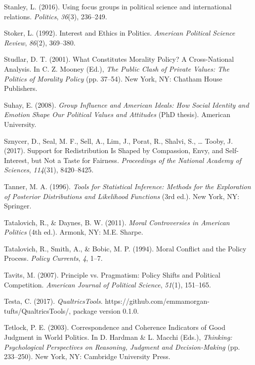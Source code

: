 \documentclass[12pt,econ]{sources/authesis}
\begin{document}
\leavevmode\hypertarget{ref-stanley_2016_using}{}%
Stanley, L. (2016). Using focus groups in political science and international relations. \emph{Politics}, \emph{36}(3), 236--249.

\leavevmode\hypertarget{ref-stoker_1992_interest}{}%
Stoker, L. (1992). Interest and Ethics in Politics. \emph{American Political Science Review}, \emph{86}(2), 369--380.

\leavevmode\hypertarget{ref-studlar_2001_what}{}%
Studlar, D. T. (2001). What Constitutes Morality Policy? A Cross-National Analysis. In C. Z. Mooney (Ed.), \emph{The Public Clash of Private Values: The Politics of Morality Policy} (pp. 37--54). New York, NY: Chatham House Publishers.

\leavevmode\hypertarget{ref-suhay_2008_group}{}%
Suhay, E. (2008). \emph{Group Influence and American Ideals: How Social Identity and Emotion Shape Our Political Values and Attitudes} (PhD thesis). American University.

\leavevmode\hypertarget{ref-sznycer_2017_support}{}%
Sznycer, D., Seal, M. F., Sell, A., Lim, J., Porat, R., Shalvi, S., \ldots{} Tooby, J. (2017). Support for Redistribution Is Shaped by Compassion, Envy, and Self-Interest, but Not a Taste for Fairness. \emph{Proceedings of the National Academy of Sciences}, \emph{114}(31), 8420--8425.

\leavevmode\hypertarget{ref-tanner_1996_tools}{}%
Tanner, M. A. (1996). \emph{Tools for Statistical Inference: Methods for the Exploration of Posterior Distributions and Likelihood Functions} (3rd ed.). New York, NY: Springer.

\leavevmode\hypertarget{ref-tatalovich_moral_2011}{}%
Tatalovich, R., \& Daynes, B. W. (2011). \emph{Moral Controversies in American Politics} (4th ed.). Armonk, NY: M.E. Sharpe.

\leavevmode\hypertarget{ref-tatalovich_moral_1994}{}%
Tatalovich, R., Smith, A., \& Bobic, M. P. (1994). Moral Conflict and the Policy Process. \emph{Policy Currents}, \emph{4}, 1--7.

\leavevmode\hypertarget{ref-tavits_2007_principle}{}%
Tavits, M. (2007). Principle vs. Pragmatism: Policy Shifts and Political Competition. \emph{American Journal of Political Science}, \emph{51}(1), 151--165.

\leavevmode\hypertarget{ref-testa_2017_qualtricstools}{}%
Testa, C. (2017). \emph{QualtricsTools}. https://github.com/emmamorgan-tufts/QualtricsTools/, package version 0.1.0.

\leavevmode\hypertarget{ref-tetlock_correspondence_2003}{}%
Tetlock, P. E. (2003). Correspondence and Coherence Indicators of Good Judgment in World Politics. In D. Hardman \& L. Macchi (Eds.), \emph{Thinking: Psychological Perspectives on Reasoning, Judgment and Decision-Making} (pp. 233--250). New York, NY: Cambridge University Press.
\end{document}
